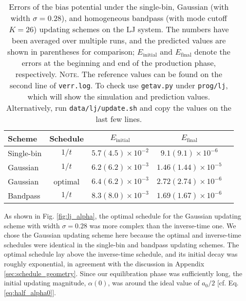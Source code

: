 \documentclass[preprint, superscriptaddress, floatfix]{revtex4-1}
\newcommand{\note}[1]{{\color{DarkGreen}\footnotesize \textsc{Note.} #1}}
\newcommand{\Err}{E}
\begin{document}
\begin{table}[h]
  \caption{\label{tab:lj_error}
    Errors of the bias potential under
    the single-bin,
    Gaussian (with width $\sigma = 0.28$),
    and homogeneous bandpass (with mode cutoff $K = 26$)
    updating schemes
    on the LJ system.
    The numbers have been averaged over multiple runs,
    and the predicted values are shown in parentheses for comparison;
    $\Err_\mathrm{initial}$ and $\Err_\mathrm{final}$
    denote the errors at the beginning and end of the production phase, respectively.
    \note{The reference values can be found
    on the second line of \texttt{verr.log}.
    To check use \texttt{getav.py} under \texttt{prog/lj},
    which will show the simulation and prediction values.
    Alternatively, run \texttt{data/lj/update.sh} and copy the values
    on the last few lines.}%
  }
  \setlength{\tabcolsep}{2pt}
  \renewcommand\arraystretch{1.4}
  \begin{tabular} { l c c c c }
    \hline
    Scheme & Schedule &
    $\Err_\mathrm{initial}$ &
    $\Err_\mathrm{final}$
    \\
    \hline
    Single-bin & $1/t$
    & $5.7(4.5)\times10^{-2}$
    & $9.1(9.1)\times10^{-6}$
    \\
    Gaussian & $1/t$
    & $6.2(6.2)\times10^{-3}$
    & $1.46(1.44)\times10^{-5}$
    \\
    Gaussian & optimal
    & $6.4(6.2)\times10^{-3}$
    & $2.72(2.74)\times10^{-6}$
    \\
    Bandpass & $1/t$
    & $8.3(8.0)\times10^{-3}$
    & $1.69(1.67)\times10^{-6}$
    \\
    \hline
  \end{tabular}
\end{table}

As shown in Fig. \ref{fig:lj_alpha},
the optimal schedule for the Gaussian updating scheme
with width $\sigma = 0.28$
was more complex than the inverse-time one.
%
We chose the Gaussian updating scheme here because
the optimal and inverse-time schedules were identical
in the single-bin and bandpass updating schemes.
%
The optimal schedule lay above the inverse-time schedule,
and its initial decay was roughly exponential,
in agreement with the discussion in Appendix \ref{sec:schedule_geometry}.
%
Since our equilibration phase was sufficiently long,
the initial updating magnitude, $\alpha(0)$,
was around the ideal value of $a_0/2$
[cf. Eq. \eqref{eq:half_alpha0}].
\end{document}
